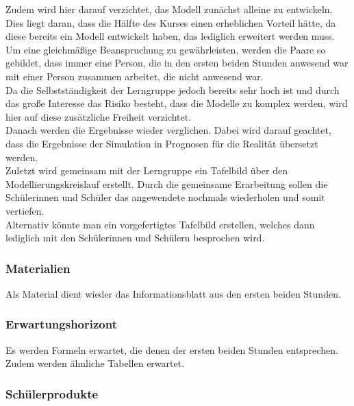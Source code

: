 Zudem wird hier darauf verzichtet, das Modell zunächst alleine zu entwickeln. Dies liegt daran, dass die Hälfte des Kurses einen erheblichen Vorteil hätte, da diese bereits ein Modell entwickelt haben, das lediglich erweitert werden muss. Um eine gleichmäßige Beanspruchung zu gewährleisten, werden die Paare so gebildet, dass immer eine Person, die in den ersten beiden Stunden anwesend war mit einer Person zusammen arbeitet, die nicht anwesend war.\\
Da die Selbstständigkeit der Lerngruppe jedoch bereits sehr hoch ist und durch das große Interesse das Risiko besteht, dass die Modelle zu komplex werden, wird hier auf diese zusätzliche Freiheit verzichtet.\\
Danach werden die Ergebnisse wieder verglichen. Dabei wird darauf geachtet, dass die Ergebnisse der Simulation in Prognosen für die Realität übersetzt werden.\\
Zuletzt wird gemeinsam mit der Lerngruppe ein Tafelbild über den Modellierungskreislauf erstellt. Durch die gemeinsame Erarbeitung sollen die Schülerinnen und Schüler das angewendete nochmals wiederholen und somit vertiefen.\\
Alternativ könnte man ein vorgefertigtes Tafelbild erstellen, welches dann lediglich mit den Schülerinnen und Schülern besprochen wird.


\subsubsection{Materialien}
Als Material dient wieder das Informationsblatt aus den ersten beiden Stunden.
\subsubsection{Erwartungshorizont}
Es werden Formeln erwartet, die denen der ersten beiden Stunden entsprechen. Zudem werden ähnliche Tabellen erwartet.
\subsubsection{Schülerprodukte}
